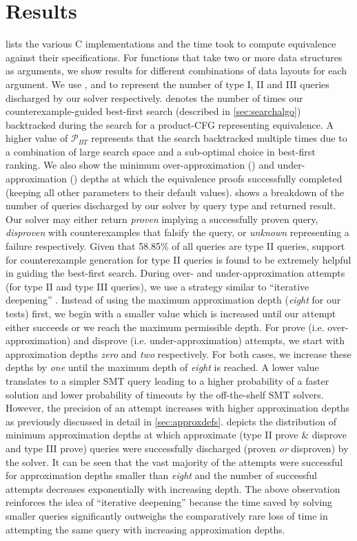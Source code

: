 \section{Results}
\label{sec:results}
 lists the various C implementations and the time \toolName{} took
to compute equivalence against their specifications.
For functions that take two or more data structures as arguments, we show
results for different combinations of data layouts for each argument.
We use ,  and  to represent the number of type I, II and III
queries discharged by our solver respectively.
\btcount{} denotes the number of times our counterexample-guided best-first search (described in \cref{sec:searchalgo}) backtracked
during the search for a product-CFG representing equivalence.
A higher value of $\mathcal{P}_{BT}$ represents that the search backtracked multiple times due to a combination of large search space
and a sub-optimal choice in best-first ranking.
We also show the minimum over-approximation () and under-approximation () depths
at which the equivalence proofs successfully completed (keeping all other parameters to their
default values).
 shows a breakdown of the number of queries discharged by our solver by query type and returned result.
Our solver may either return {\em proven} implying a successfully proven query, {\em disproven} with counterexamples
that falsify the query, or {\em unknown} representing a failure respectively.
Given that 58.85\% of all queries are type II queries, support for counterexample generation for type II queries is found to be
extremely helpful in guiding the best-first search.
During over- and under-approximation attempts (for type II and type III queries), we use a strategy similar to ``iterative deepening'' \cite{iterativedeepening}.
Instead of using the maximum approximation depth ({\em eight} for our tests) first, we begin with a smaller value which is increased until
our attempt either succeeds or we reach the maximum permissible depth.
For prove (i.e. over-approximation) and disprove (i.e. under-approximation) attempts, we start with approximation depths {\em zero} and {\em two} respectively.
For both cases, we increase these depths by {\em one} until the maximum depth of {\em eight} is reached.
A lower value translates to a simpler SMT query leading to a higher probability of a faster solution and lower probability of timeouts by the off-the-shelf SMT solvers.
However, the precision of an attempt increases with higher approximation depths as previously discussed in detail in \cref{sec:approxdefs}.
 depicts the distribution of minimum approximation depths at which approximate (type II prove \& disprove and type III prove) queries
were successfully discharged (proven {\em or} disproven) by the solver.
It can be seen that the vast majority of the attempts were successful for approximation depths smaller than {\em eight}
and the number of successful attempts decreases exponentially with increasing depth.
The above observation reinforces the idea of ``iterative deepening'' because the time saved by solving smaller queries significantly
outweighs the comparatively rare loss of time in attempting the same query with increasing approximation depths.

